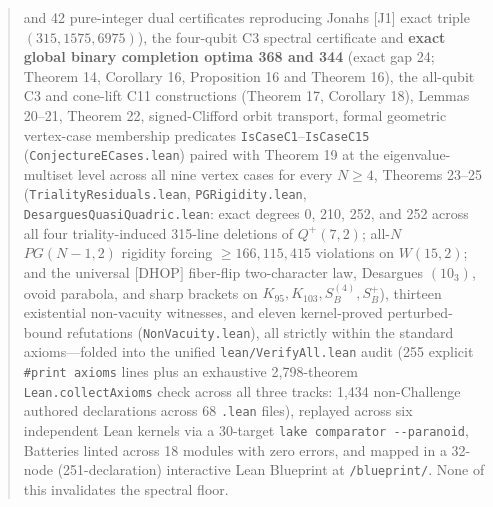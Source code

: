 \documentclass[11pt,a4paper]{article}
\begin{document}
\begin{quote}
and 42 pure-integer dual certificates reproducing Jonah\textquotesingle s {[}J1{]} exact triple \((315,1575,6975)\)), the
four-qubit C3 spectral certificate and \textbf{exact global binary completion optima 368 and 344} (exact gap
24; Theorem 14, Corollary 16, Proposition 16\textquotesingle{} and Theorem 16\textquotesingle\textquotesingle), the all-qubit C3 and cone-lift C11
constructions (Theorem 17, Corollary 18), Lemmas 20--21, Theorem 22, signed-Clifford orbit transport,
formal geometric vertex-case membership predicates \texttt{IsCaseC1}--\texttt{IsCaseC15} (\nolinkurl{ConjectureECases.lean})
paired with Theorem 19 at the eigenvalue-multiset level across all nine vertex cases for every \(N\ge4\),
Theorems 23--25 (\nolinkurl{TrialityResiduals.lean}, \nolinkurl{PGRigidity.lean}, \nolinkurl{DesarguesQuasiQuadric.lean}:
exact degrees 0, 210, 252, and 252 across all four triality-induced 315-line deletions of \(Q^+(7,2)\);
all-\(N\) \(PG(N-1,2)\) rigidity forcing \(\ge 166{,}115{,}415\) violations on \(W(15,2)\); and the universal
\([\)DHOP\(]\) fiber-flip two-character law, Desargues \((10_3)\), ovoid parabola, and sharp brackets on \(K_{95}, K_{103}, S_B^{(4)}, S_B^+\)),
thirteen existential non-vacuity witnesses, and eleven kernel-proved perturbed-bound refutations (\texttt{NonVacuity.lean}), all
strictly within the standard axioms---folded into the unified \nolinkurl{lean/VerifyAll.lean} audit (255 explicit
\texttt{\#print\ axioms} lines plus an exhaustive 2,798-theorem \texttt{Lean.collectAxioms} check across all
three tracks: 1,434 non-Challenge authored declarations across 68 \texttt{.lean} files), replayed across six
independent Lean kernels via a 30-target \texttt{lake\ comparator\ -\/-paranoid}, Batteries linted across 18 modules
with zero errors, and mapped in a 32-node (251-declaration) interactive Lean Blueprint at \texttt{/blueprint/}. None of this
invalidates the spectral floor.
\end{quote}
\end{document}
